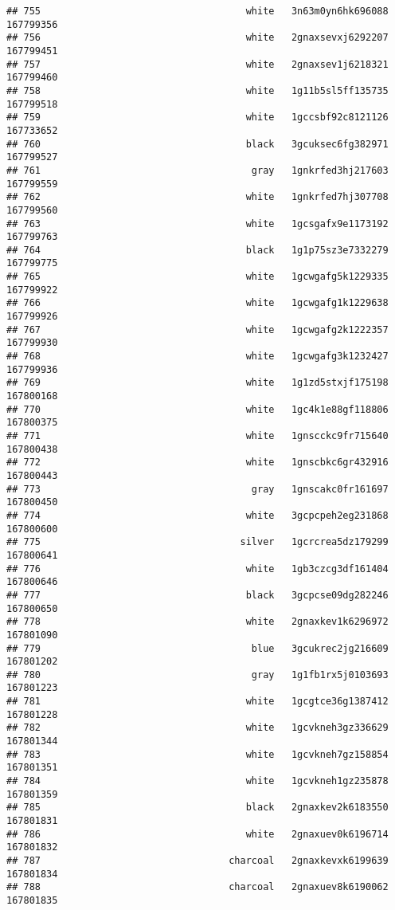 \documentclass[
]{article}
\begin{document}
\begin{verbatim}
## 755                                    white   3n63m0yn6hk696088 167799356
## 756                                    white   2gnaxsevxj6292207 167799451
## 757                                    white   2gnaxsev1j6218321 167799460
## 758                                    white   1g11b5sl5ff135735 167799518
## 759                                    white   1gccsbf92c8121126 167733652
## 760                                    black   3gcuksec6fg382971 167799527
## 761                                     gray   1gnkrfed3hj217603 167799559
## 762                                    white   1gnkrfed7hj307708 167799560
## 763                                    white   1gcsgafx9e1173192 167799763
## 764                                    black   1g1p75sz3e7332279 167799775
## 765                                    white   1gcwgafg5k1229335 167799922
## 766                                    white   1gcwgafg1k1229638 167799926
## 767                                    white   1gcwgafg2k1222357 167799930
## 768                                    white   1gcwgafg3k1232427 167799936
## 769                                    white   1g1zd5stxjf175198 167800168
## 770                                    white   1gc4k1e88gf118806 167800375
## 771                                    white   1gnscckc9fr715640 167800438
## 772                                    white   1gnscbkc6gr432916 167800443
## 773                                     gray   1gnscakc0fr161697 167800450
## 774                                    white   3gcpcpeh2eg231868 167800600
## 775                                   silver   1gcrcrea5dz179299 167800641
## 776                                    white   1gb3czcg3df161404 167800646
## 777                                    black   3gcpcse09dg282246 167800650
## 778                                    white   2gnaxkev1k6296972 167801090
## 779                                     blue   3gcukrec2jg216609 167801202
## 780                                     gray   1g1fb1rx5j0103693 167801223
## 781                                    white   1gcgtce36g1387412 167801228
## 782                                    white   1gcvkneh3gz336629 167801344
## 783                                    white   1gcvkneh7gz158854 167801351
## 784                                    white   1gcvkneh1gz235878 167801359
## 785                                    black   2gnaxkev2k6183550 167801831
## 786                                    white   2gnaxuev0k6196714 167801832
## 787                                 charcoal   2gnaxkevxk6199639 167801834
## 788                                 charcoal   2gnaxuev8k6190062 167801835

\end{verbatim}
\end{document}

